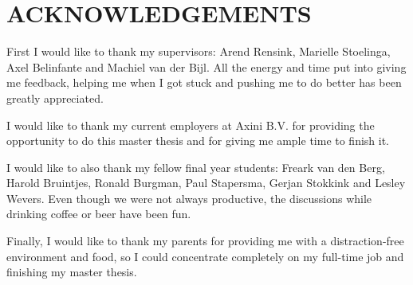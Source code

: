 \section*{ACKNOWLEDGEMENTS}

First I would like to thank my supervisors: Arend Rensink, Marielle Stoelinga, Axel Belinfante and Machiel van der Bijl.
All the energy and time put into giving me feedback, helping me when I got stuck and pushing me to do better has been greatly appreciated.

I would like to thank my current employers at Axini B.V. for providing the opportunity to do this master thesis and for giving me ample time to finish it.

I would like to also thank my fellow final year students: Freark van den Berg, Harold Bruintjes, Ronald Burgman, Paul Stapersma, Gerjan Stokkink and Lesley Wevers. Even though we were not always productive, the discussions while drinking coffee or beer have been fun.

Finally, I would like to thank my parents for providing me with a distraction-free environment and food, so I could concentrate completely on my full-time job and finishing my master thesis.

